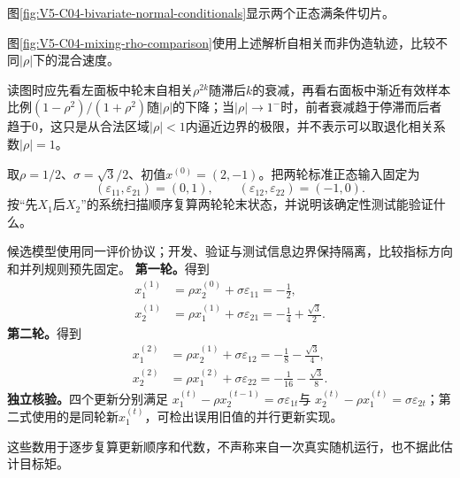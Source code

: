 图\ref{fig:V5-C04-bivariate-normal-conditionals}显示两个正态满条件切片。

图\ref{fig:V5-C04-mixing-rho-comparison}使用上述解析自相关而非伪造轨迹，比较不同$|\rho|$下的混合速度。

\FloatBarrier
读图时应先看左面板中轮末自相关$\rho^{2k}$随滞后$k$的衰减，再看右面板中渐近有效样本比例$(1-\rho^2)/(1+\rho^2)$随$|\rho|$的下降；当$|\rho|\to1^-$时，前者衰减趋于停滞而后者趋于$0$，这只是从合法区域$|\rho|<1$内逼近边界的极限，并不表示可以取退化相关系数$|\rho|=1$。

\begin{example}[两轮确定性更新测试]\label{exm:V5-C04-two-sweeps}
取$\rho=1/2$、$\sigma=\sqrt3/2$、初值$x^{(0)}=(2,-1)$。把两轮标准正态输入固定为
\[
(\varepsilon_{11},\varepsilon_{21})=(0,1),
\qquad
(\varepsilon_{12},\varepsilon_{22})=(-1,0).
\]
按“先$X_1$后$X_2$”的系统扫描顺序复算两轮轮末状态，并说明该确定性测试能验证什么。
\end{example}

\begin{solution}
\SolGiven 候选模型使用同一评价协议；开发、验证与测试信息边界保持隔离，比较指标方向和并列规则预先固定。
\SolDerive
\textbf{第一轮。}得到
\[
\begin{aligned}
x_1^{(1)}&=\rho x_2^{(0)}+\sigma\varepsilon_{11}
=-\frac12,\\
x_2^{(1)}&=\rho x_1^{(1)}+\sigma\varepsilon_{21}
=-\frac14+\frac{\sqrt3}{2}.
\end{aligned}
\]
\textbf{第二轮。}得到
\[
\begin{aligned}
x_1^{(2)}&=\rho x_2^{(1)}+\sigma\varepsilon_{12}
=-\frac18-\frac{\sqrt3}{4},\\
x_2^{(2)}&=\rho x_1^{(2)}+\sigma\varepsilon_{22}
=-\frac1{16}-\frac{\sqrt3}{8}.
\end{aligned}
\]
\textbf{独立核验。}四个更新分别满足
$x_1^{(t)}-\rho x_2^{(t-1)}=\sigma\varepsilon_{1t}$与
$x_2^{(t)}-\rho x_1^{(t)}=\sigma\varepsilon_{2t}$；第二式使用的是同轮新$x_1^{(t)}$，可检出误用旧值的并行更新实现。

\SolAnswer 这些数用于逐步复算更新顺序和代数，不声称来自一次真实随机运行，也不据此估计目标矩。
\end{solution}

